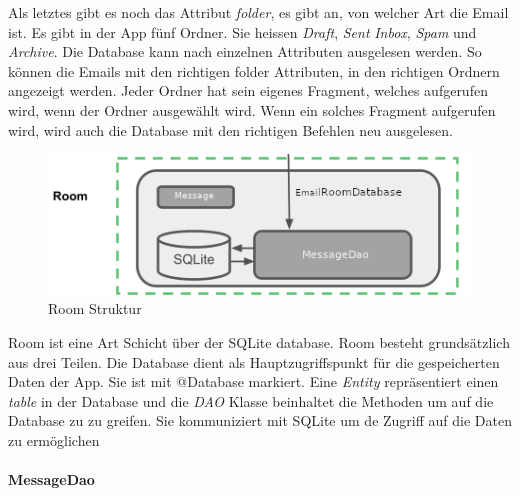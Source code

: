 \documentclass[a4paper,11pt]{article}
\begin{document}
Als letztes gibt es noch das Attribut \textit{folder}, es gibt an, von welcher Art die Email ist. Es gibt in der App fünf Ordner. Sie heissen \textit{Draft}, \textit{Sent} 
\textit{Inbox}, \textit{Spam} und \textit{Archive}. Die Database kann nach einzelnen Attributen ausgelesen werden. So können die Emails mit den richtigen
folder Attributen, in den richtigen Ordnern angezeigt werden. Jeder Ordner hat sein eigenes Fragment, welches aufgerufen wird, wenn der Ordner ausgewählt wird.
Wenn ein solches Fragment aufgerufen wird, wird auch die Database mit den richtigen Befehlen neu ausgelesen.  \\





\begingroup
\setlength{\intextsep}{10pt}
\setlength{\columnsep}{15pt}

\begin{figure}
    \centering
    \includegraphics[width=.4\textwidth]{media/RoomStructure.png}
    \caption{Room Struktur \cite{appStructurePicture}}
\end{figure}


Room ist eine Art Schicht über der SQLite database. 
Room besteht grundsätzlich aus drei Teilen. Die Database dient als Hauptzugriffspunkt für die gespeicherten Daten der App. Sie ist mit @Database markiert. 
Eine \textit{Entity} repräsentiert einen \textit{table} in der Database und die \textit{DAO} Klasse beinhaltet die Methoden um auf die Database zu zu greifen. Sie kommuniziert
mit SQLite um de Zugriff auf die Daten zu ermöglichen \cite{roomStructure}


\paragraph{MessageDao}
\end{document}
